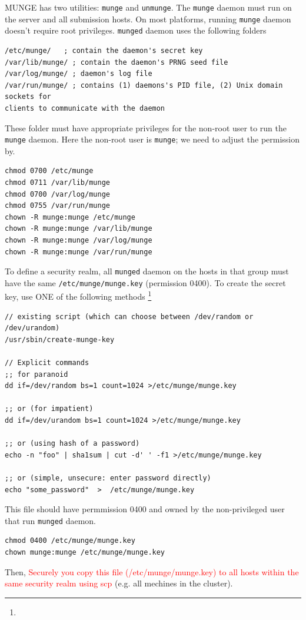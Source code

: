 MUNGE has two utilities: \verb!munge! and \verb!unmunge!. The \verb!munge!
daemon must run on the server and all submission hosts. On most platforms,
running \verb!munge! daemon doesn't require root privileges. \verb!munged!
daemon uses the following folders
\begin{verbatim}
/etc/munge/   ; contain the daemon's secret key
/var/lib/munge/ ; contain the daemon's PRNG seed file
/var/log/munge/ ; daemon's log file
/var/run/munge/ ; contains (1) daemons's PID file, (2) Unix domain sockets for
clients to communicate with the daemon
\end{verbatim}
These folder must have appropriate privileges for the non-root user to run the
\verb!munge! daemon. Here the non-root user is \verb!munge!; we need to adjust
the permission by.
\begin{verbatim}
chmod 0700 /etc/munge
chmod 0711 /var/lib/munge
chmod 0700 /var/log/munge
chmod 0755 /var/run/munge
chown -R munge:munge /etc/munge
chown -R munge:munge /var/lib/munge
chown -R munge:munge /var/log/munge
chown -R munge:munge /var/run/munge
\end{verbatim}


To define a security realm, all \verb!munged! daemon on the hosts in that
group must have the same \verb!/etc/munge/munge.key! (permission 0400). To
create the secret key, use ONE of the
following methods \footnote{}
\begin{verbatim}
// existing script (which can choose between /dev/random or /dev/urandom)
/usr/sbin/create-munge-key

// Explicit commands
;; for paranoid
dd if=/dev/random bs=1 count=1024 >/etc/munge/munge.key

;; or (for impatient)
dd if=/dev/urandom bs=1 count=1024 >/etc/munge/munge.key

;; or (using hash of a password)
echo -n "foo" | sha1sum | cut -d' ' -f1 >/etc/munge/munge.key

;; or (simple, unsecure: enter password directly) 
echo "some_password"  >  /etc/munge/munge.key
\end{verbatim}
This file should have permmission 0400 and owned by the non-privileged user that
run \verb!munged! daemon.
\begin{verbatim}
chmod 0400 /etc/munge/munge.key
chown munge:munge /etc/munge/munge.key
\end{verbatim}
Then, \textcolor{red}{Securely you copy this file
(/etc/munge/munge.key) to all hosts within the same security realm using scp}
(e.g. all mechines in the cluster).

